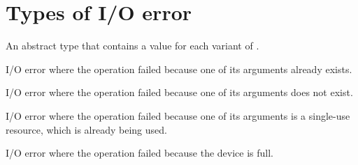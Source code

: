 \section{Types of I/O error}
\begin{haddockdesc}
\item[\begin{tabular}{@{}l}
data IOErrorType
\end{tabular}]
{\haddockbegindoc
An abstract type that contains a value for each variant of .\par}
\end{haddockdesc}
\begin{haddockdesc}
\item[\begin{tabular}{@{}l}
instance Show IOErrorType\\instance Eq IOErrorType
\end{tabular}]
\end{haddockdesc}
\begin{haddockdesc}
\item[\begin{tabular}{@{}l}
alreadyExistsErrorType :: IOErrorType
\end{tabular}]
{\haddockbegindoc
I/O error where the operation failed because one of its arguments
 already exists.\par}
\end{haddockdesc}
\begin{haddockdesc}
\item[\begin{tabular}{@{}l}
doesNotExistErrorType :: IOErrorType
\end{tabular}]
{\haddockbegindoc
I/O error where the operation failed because one of its arguments
 does not exist.\par}
\end{haddockdesc}
\begin{haddockdesc}
\item[\begin{tabular}{@{}l}
alreadyInUseErrorType :: IOErrorType
\end{tabular}]
{\haddockbegindoc
I/O error where the operation failed because one of its arguments
 is a single-use resource, which is already being used.\par}
\end{haddockdesc}
\begin{haddockdesc}
\item[\begin{tabular}{@{}l}
fullErrorType :: IOErrorType
\end{tabular}]
{\haddockbegindoc
I/O error where the operation failed because the device is full.\par}
\end{haddockdesc}
